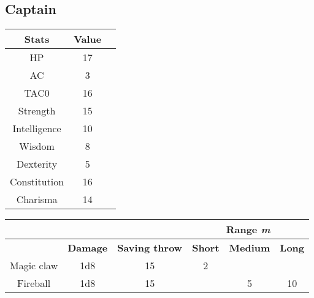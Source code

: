 \subsection{Captain}
\begin{table}[H]
  \centering
\begin{tabular}{|c|c|c|}
\hline
\rowcolor[HTML]{C0C0C0}
\textbf{Stats} & \textbf{Value } \\ \hline
HP & 17  \\ \hline
AC & 3 \\ \hline
TAC0 & 16 \\ \hline
Strength & 15  \\ \hline
Intelligence & 10 \\ \hline
Wisdom & 8 \\ \hline
Dexterity & 5  \\ \hline
Constitution & 16 \\ \hline
Charisma & 14 \\ \hline
\end{tabular}
\end{table}
\begin{table}[H]
\centering
 \begin{tabular}{lll|c|c|c|}
\cline{4-6}
 &  & & \multicolumn{3}{c|}{\cellcolor[HTML]{C0C0C0}\textbf{Range \textit{m}}} \\ \hline
\rowcolor[HTML]{C0C0C0}
\multicolumn{1}{|l|}{\cellcolor[HTML]{C0C0C0}\textbf{Weapon}} & \textbf{Damage} & \textbf{Saving throw}&\multicolumn{1}{l|}{\cellcolor[HTML]{C0C0C0}\textbf{Short}} & \textbf{Medium} & \textbf{Long} \\ \hline
\multicolumn{1}{|c|}{Magic claw} & \multicolumn{1}{c|}{1d8} & \multicolumn{1}{c|}{15} & 2 &  &  \\ \hline
\multicolumn{1}{|c|}{Fireball} & \multicolumn{1}{c|}{1d8} & \multicolumn{1}{c|}{15}   &  & 5 & 10 \\ \hline
\end{tabular}
  \end{table}

